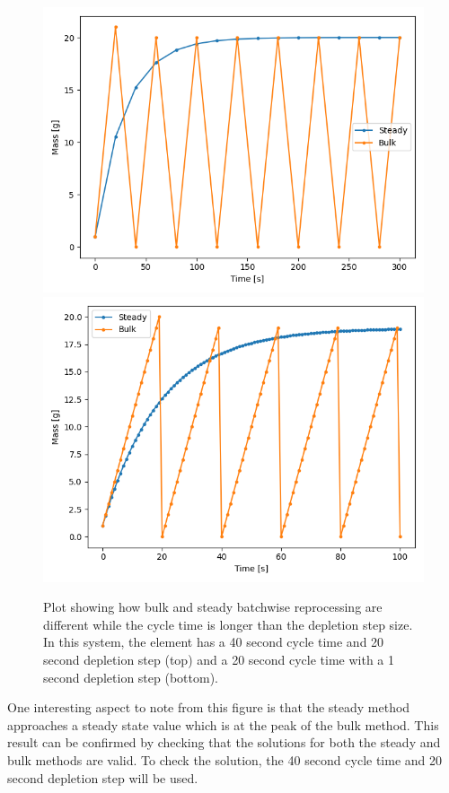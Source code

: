 \begin{figure}[H]
  \centering
  \includegraphics[scale=0.75]{images/batch-40-20.png}
  \includegraphics[scale=0.75]{images/batch-20-1.png}
  \caption{Plot showing how bulk and steady batchwise reprocessing are different while the cycle time is longer than the depletion step size. In this system, the element has a 40 second cycle time and 20 second depletion step (top) and a 20 second cycle time with a 1 second depletion step (bottom).}
   \label{fig:bulk_repr_diff}
\end{figure}

One interesting aspect to note from this figure is that the steady method approaches a steady state value which is at the peak of the bulk method. This result can be confirmed by checking that the solutions for both the steady and bulk methods are valid. To check the solution, the 40 second cycle time and 20 second depletion step will be used. 

